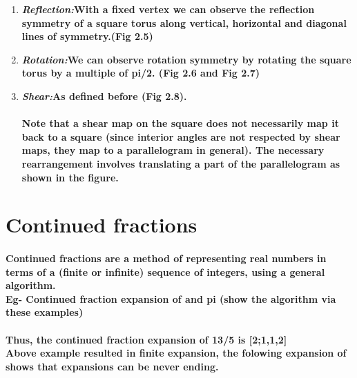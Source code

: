 \documentclass{report}
\begin{document}
\begin{enumerate}
\item \textbf{\emph{Reflection:}With a fixed vertex we can observe the reflection symmetry of a square torus along vertical, horizontal and diagonal lines of symmetry.(Fig 2.5) }
\item \textbf{\emph{Rotation:}We can observe rotation symmetry by rotating the square torus by a multiple of pi/2. (Fig 2.6 and Fig 2.7)}
\item \textbf{\emph{Shear:}As defined before (Fig 2.8). \\  \\ Note that a shear map on the square does not necessarily map it back to a square (since interior angles are not respected by shear maps, they map to a parallelogram in general). The necessary rearrangement involves translating a part of the parallelogram as shown in the figure. }

\end{enumerate}

\section{Continued fractions}

\paragraph{Continued fractions are a method of representing real numbers in terms of a (finite or infinite) sequence of integers, using a general algorithm. \\ Eg- Continued fraction expansion of  and pi (show the algorithm via these examples)}

 
\paragraph{Thus, the continued fraction expansion of 13/5 is [2;1,1,2] \\ Above example resulted in finite expansion, the folowing expansion of \pi shows that expansions can be never ending.}

\end{document}
